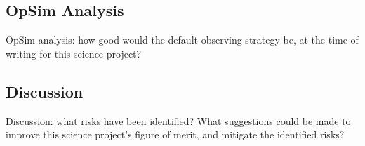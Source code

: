 
\subsection{OpSim Analysis}
\label{sec:\secname:analysis}

OpSim analysis: how good would the default observing strategy be, at
the time of writing for this science project?



\subsection{Discussion}
\label{sec:\secname:discussion}

Discussion: what risks have been identified? What suggestions could be
made to improve this science project's figure of merit, and mitigate
the identified risks?



\navigationbar

